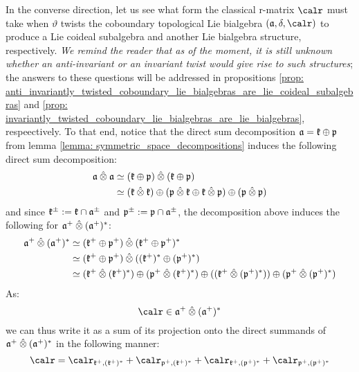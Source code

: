         In the converse direction, let us see what form the classical r-matrix $\calr$ must take when $\vartheta$ twists the coboundary topological Lie bialgebra $(\a, \delta, \calr)$ to produce a Lie coideal subalgebra and another Lie bialgebra structure, respectively. \textit{We remind the reader that as of the moment, it is still unknown whether an anti-invariant or an invariant twist would give rise to such structures}; the answers to these questions will be addressed in propositions \ref{prop: anti_invariantly_twisted_coboundary_lie_bialgebras_are_lie_coideal_subalgebras} and \ref{prop: invariantly_twisted_coboundary_lie_bialgebras_are_lie_bialgebras}, respeectively. To that end, notice that the direct sum decomposition $\mathfrak{a} = \mathfrak{k} \oplus \mathfrak{p}$ from lemma \ref{lemma: symmetric_space_decompositions} induces the following direct sum decomposition:
            \begin{equation}
                \begin{aligned}
                    \a \hattensor \a & \cong (\k \oplus \p) \hattensor (\k \oplus \p)
                    \\
                    & \cong (\k \hattensor \k) \oplus (\p \hattensor \k \oplus \k \hattensor \p) \oplus (\p \hattensor \p)
                \end{aligned}
            \end{equation}
        and since $\mathfrak{k}^{\pm} := \mathfrak{k} \cap \mathfrak{a}^{\pm}$ and $\mathfrak{p}^{\pm} := \mathfrak{p} \cap \mathfrak{a}^{\pm}$, the decomposition above induces the following for $\a^+ \hattensor (\a^+)^*$:
            \begin{equation}
                \begin{aligned}
                    \a^+ \hattensor (\a^+)^* & \cong (\k^+ \oplus \p^+) \hattensor (\k^+ \oplus \p^+)^*
                    \\
                    & \cong (\k^+ \oplus \p^+) \hattensor ( (\k^+)^*  \oplus (\p^+)^* )
                    \\
                    & \cong ( \k^+ \hattensor (\k^+)^* ) \oplus ( \p^+ \hattensor (\k^+)^* ) \oplus ( ( \k^+ \hattensor (\p^+)^* ) ) \oplus ( \p^+ \hattensor (\p^+)^* )
                \end{aligned}
            \end{equation}
        As:
            $$\calr \in \a^+ \hattensor (\a^+)^*$$
        we can thus write it as a sum of its projection onto the direct summands of $\a^+ \hattensor (\a^+)^*$ in the following manner:
            \begin{equation}
                \calr = \calr_{\k^+, (\k^+)^*} + \calr_{\p^+, (\k^+)^*} + \calr_{\k^+, (\p^+)^*} + \calr_{\p^+, (\p^+)^*}
            \end{equation}
